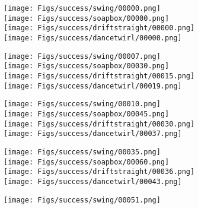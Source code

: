 \documentclass[runningheads]{llncs}
\newlength\figwidth
\begin{document}
\begin{figure*}
\begin{center}
		\begin{subfigure}[b]{\figwidth}
			\texttt{[image: Figs/success/swing/00000.png]} \\
		    \texttt{[image: Figs/success/soapbox/00000.png]} \\
			\texttt{[image: Figs/success/driftstraight/00000.png]} \\
			\texttt{[image: Figs/success/dancetwirl/00000.png]} \\
\end{subfigure}\hfill
		\begin{subfigure}[b]{\figwidth}
			\texttt{[image: Figs/success/swing/00007.png]} \\
			\texttt{[image: Figs/success/soapbox/00030.png]} \\
			\texttt{[image: Figs/success/driftstraight/00015.png]} \\
			\texttt{[image: Figs/success/dancetwirl/00019.png]} \\
\end{subfigure}\hfill
		\begin{subfigure}[b]{\figwidth}
			\texttt{[image: Figs/success/swing/00010.png]} \\
			\texttt{[image: Figs/success/soapbox/00045.png]} \\
			\texttt{[image: Figs/success/driftstraight/00030.png]} \\
			\texttt{[image: Figs/success/dancetwirl/00037.png]} \\
\end{subfigure}\hfill
		\begin{subfigure}[b]{\figwidth}
			\texttt{[image: Figs/success/swing/00035.png]} \\
			\texttt{[image: Figs/success/soapbox/00060.png]} \\
			\texttt{[image: Figs/success/driftstraight/00036.png]} \\
			\texttt{[image: Figs/success/dancetwirl/00043.png]} \\
\end{subfigure}\hfill
		\begin{subfigure}[b]{\figwidth}
			\texttt{[image: Figs/success/swing/00051.png]} \\

\end{subfigure}
\end{center}
\end{figure*}
\end{document}
